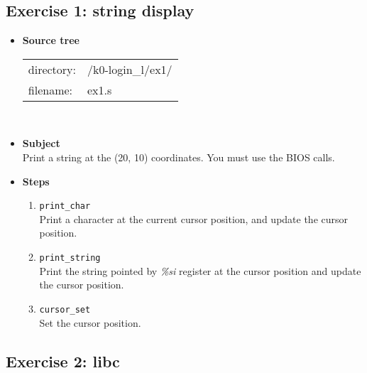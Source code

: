 {\subsection*{Exercise 1: string display}
\begin{itemize}
\item {\bf Source tree}\\
\begin{tabular}{p{4cm}l}
directory: & /k0-login\_l/ex1/\\
filename: & ex1.s
\end{tabular}
\\
\item {\bf Subject}\\
Print a string at the (20, 10) coordinates. You must use the BIOS calls.\\
\item {\bf Steps}
\begin{enumerate}
\item {\tt print\_char}\\
Print a character at the current cursor position, and update the cursor position.
\item {\tt print\_string}\\
Print the string pointed by {\em \%si} register at the cursor position and update the cursor position.
\item{\tt cursor\_set}\\
Set the cursor position.
\end{enumerate}
\end{itemize}

\newpage

\subsection*{Exercise 2: libc}

}
